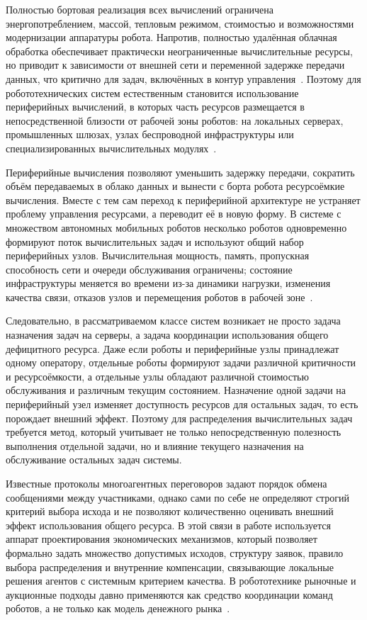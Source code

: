 Полностью бортовая реализация всех вычислений ограничена энергопотреблением, массой, тепловым режимом, стоимостью и возможностями модернизации аппаратуры робота. Напротив, полностью удалённая облачная обработка обеспечивает практически неограниченные вычислительные ресурсы, но приводит к зависимости от внешней сети и переменной задержке передачи данных, что критично для задач, включённых в контур управления~\cite{Hu2012CloudRobotics,Wan2016CloudRobotics,Afrin2021CloudRoboticsSurvey}. Поэтому для робототехнических систем естественным становится использование периферийных вычислений, в которых часть ресурсов размещается в непосредственной близости от рабочей зоны роботов: на локальных серверах, промышленных шлюзах, узлах беспроводной инфраструктуры или специализированных вычислительных модулях~\cite{Shi2016Edge,Satyanarayanan2017Emergence,Mao2017MECPerspective,Mach2017MECSurvey,Tahir2025EdgeRoboticsSurvey}.

Периферийные вычисления позволяют уменьшить задержку передачи, сократить объём передаваемых в облако данных и вынести с борта робота ресурсоёмкие вычисления. Вместе с тем сам переход к периферийной архитектуре не устраняет проблему управления ресурсами, а переводит её в новую форму. В системе с множеством автономных мобильных роботов несколько роботов одновременно формируют поток вычислительных задач и используют общий набор периферийных узлов. Вычислительная мощность, память, пропускная способность сети и очереди обслуживания ограничены; состояние инфраструктуры меняется во времени из-за динамики нагрузки, изменения качества связи, отказов узлов и перемещения роботов в рабочей зоне~\cite{Groshev2023EdgeRoboticsReady,Chaari2022RobotOffloadingSurvey,Tahir2025EdgeRoboticsSurvey}.

Следовательно, в рассматриваемом классе систем возникает не просто задача назначения задач на серверы, а задача координации использования общего дефицитного ресурса. Даже если роботы и периферийные узлы принадлежат одному оператору, отдельные роботы формируют задачи различной критичности и ресурсоёмкости, а отдельные узлы обладают различной стоимостью обслуживания и различным текущим состоянием. Назначение одной задачи на периферийный узел изменяет доступность ресурсов для остальных задач, то есть порождает внешний эффект. Поэтому для распределения вычислительных задач требуется метод, который учитывает не только непосредственную полезность выполнения отдельной задачи, но и влияние текущего назначения на обслуживание остальных задач системы.

Известные протоколы многоагентных переговоров задают порядок обмена сообщениями между участниками, однако сами по себе не определяют строгий критерий выбора исхода и не позволяют количественно оценивать внешний эффект использования общего ресурса. В этой связи в работе используется аппарат проектирования экономических механизмов, который позволяет формально задать множество допустимых исходов, структуру заявок, правило выбора распределения и внутренние компенсации, связывающие локальные решения агентов с системным критерием качества. В робототехнике рыночные и аукционные подходы давно применяются как средство координации команд роботов, а не только как модель денежного рынка~\cite{Gerkey2004FormalMRTA,Dias2006MarketBasedMR,Qiu2022AuctionEdgeSurvey}.

